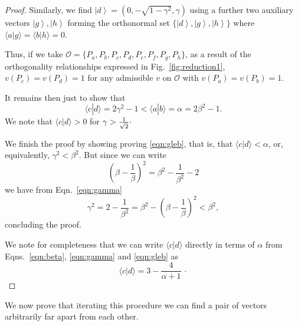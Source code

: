 \documentclass[%
 superscriptaddress,
 preprint,
 showpacs,
 showkeys,
 nofootinbib,
  amsmath,amssymb,
  aps,
  longbibliography,
  floatfix,
 ]{revtex4-1}
\theoremstyle{definition}
\newcommand{\ket}[1]{\left| #1 \right>}
\newcommand{\iprod}[2]{\langle #1 | #2 \rangle}
\begin{document}
\begin{proof}
	Similarly, we find $\ket{d}=(0,-\sqrt{1-\gamma^2},\gamma)$ using a further two auxiliary vectors $\ket{g},\ket{h}$ forming the orthonormal set $\{\ket{d},\ket{g},\ket{h}\}$ where $\iprod{a}{g}=\iprod{b}{h}=0$.
	
	Thus, if we take $\mathcal{O}=\{P_a,P_b,P_c,P_d,P_e,P_f,P_g,P_h\}$, as a result of the orthogonality relationships expressed in Fig.~\ref{fig:reduction1}, $v(P_c)=v(P_d)=1$ for any admissible $v$ on $\mathcal{O}$ with $v(P_a)=v(P_b)=1$.
	
	It remains then just to show that
	\begin{equation}\label{eqn:gleb}
		\iprod{c}{d}=2\gamma^2-1 < \iprod{a}{b}=\alpha=2\beta^2-1.
	\end{equation}
	We note that $\iprod{c}{d}>0$ for $\gamma>\frac{1}{\sqrt{2}}\raisebox{.8mm}{.}$
	
	We finish the proof by showing proving \eqref{eqn:gleb}, that is, that $\iprod{c}{d} < \alpha$, or, equivalently, $\gamma^2 < \beta^2$.
	But since we can write
	$$\left(\beta-\frac{1}{\beta}\right)^2=\beta^2-\frac{1}{\beta^2}-2$$
	we have from Eqn.~\ref{eqn:gamma}
	$$\gamma^2=2-\frac{1}{\beta^2}=\beta^2-\left(\beta-\frac{1}{\beta}\right)^2<\beta^2,$$
	 concluding the proof.
	
	 We note for completeness that we can write $\iprod{c}{d}$ directly in terms of $\alpha$ from Eqns.~\ref{eqn:beta}, \ref{eqn:gamma} and \ref{eqn:gleb} as
	 \begin{equation}\label{eqn:iprodfn}
	 	\iprod{c}{d} = 3-\frac{4}{\alpha+1}\,\cdot
	 \end{equation}
\end{proof}

We now prove that iterating this procedure we can find a pair of vectors arbitrarily far apart from each other.
\end{document}
